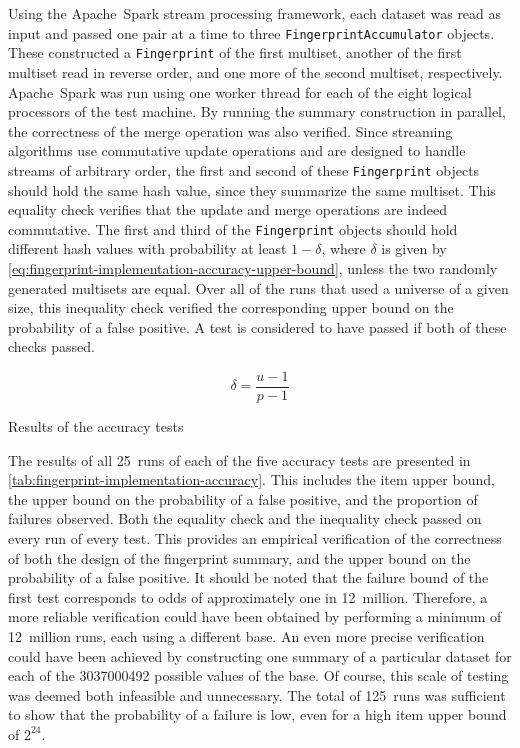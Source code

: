 Using the Apache~Spark stream processing framework, each dataset was read as input and passed one pair at a time to three \lstinline{FingerprintAccumulator} objects.
These constructed a \lstinline{Fingerprint} of the first multiset, another of the first multiset read in reverse order, and one more of the second multiset, respectively.
Apache~Spark was run using one worker thread for each of the eight logical processors of the test machine.
By running the summary construction in parallel, the correctness of the merge operation was also verified.
Since streaming algorithms use commutative update operations and are designed to handle streams of arbitrary order, the first and second of these \lstinline{Fingerprint} objects should hold the same hash value, since they summarize the same multiset.
This equality check verifies that the update and merge operations are indeed commutative.
The first and third of the \lstinline{Fingerprint} objects should hold different hash values with probability at least \( 1 - \delta \), where \( \delta \) is given by \cref{eq:fingerprint-implementation-accuracy-upper-bound}, unless the two randomly generated multisets are equal.
Over all of the runs that used a universe of a given size, this inequality check verified the corresponding upper bound on the probability of a false positive.
A test is considered to have passed if both of these checks passed.

\begin{equation}
  \label{eq:fingerprint-implementation-accuracy-upper-bound}
  \delta = \frac{u - 1}{p - 1}
\end{equation}

\begin{table}
  \centering
  \caption{Results of the accuracy tests}
  \label{tab:fingerprint-implementation-accuracy}
\end{table}

The results of all \num{25}~runs of each of the five accuracy tests are presented in \cref{tab:fingerprint-implementation-accuracy}.
This includes the item upper bound, the upper bound on the probability of a false positive, and the proportion of failures observed.
Both the equality check and the inequality check passed on every run of every test.
This provides an empirical verification of the correctness of both the design of the fingerprint summary, and the upper bound on the probability of a false positive.
It should be noted that the failure bound of the first test corresponds to odds of approximately one in \num{12}~million.
Therefore, a more reliable verification could have been obtained by performing a minimum of \num{12}~million runs, each using a different base.
An even more precise verification could have been achieved by constructing one summary of a particular dataset for each of the \num{3037000492} possible values of the base.
Of course, this scale of testing was deemed both infeasible and unnecessary.
The total of \num{125}~runs was sufficient to show that the probability of a failure is low, even for a high item upper bound of \( 2^{24} \).

